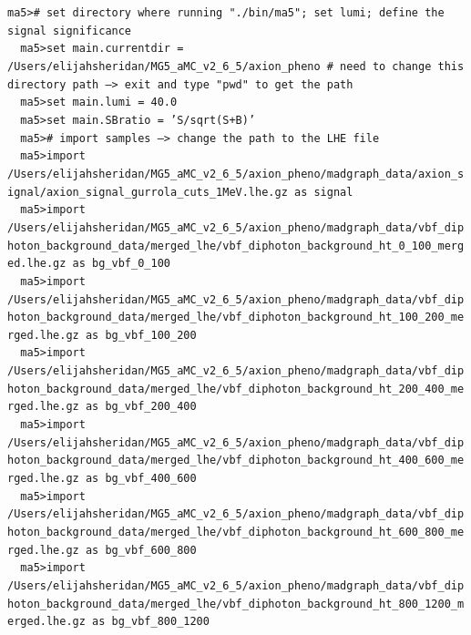 \documentclass[a4paper, 10pt]{article}
\begin{document}
\texttt{ma5>\# set directory where running "./\-bin/\-ma5"; set lumi; define the signal significance\\
}
\texttt{ }\texttt{ }\texttt{ma5>set main.currentdir = /\-Users/\-elijahsheridan/\-MG5\_aMC\_v2\_6\_5/\-axion\_pheno \# need to change this directory path --> exit and type "pwd" to get the path\\
}
\texttt{ }\texttt{ }\texttt{ma5>set main.lumi = 40.0\\
}
\texttt{ }\texttt{ }\texttt{ma5>set main.SBratio = 'S/\-sqrt(S+B)'\\
}
\texttt{ }\texttt{ }\texttt{ma5>\# import samples --> change the path to the LHE file\\
}
\texttt{ }\texttt{ }\texttt{ma5>import /\-Users/\-elijahsheridan/\-MG5\_aMC\_v2\_6\_5/\-axion\_pheno/\-madgraph\_data/\-axion\_signal/\-axion\_signal\_gurrola\_cuts\_1MeV.lhe.gz as signal\\
}
\texttt{ }\texttt{ }\texttt{ma5>import /\-Users/\-elijahsheridan/\-MG5\_aMC\_v2\_6\_5/\-axion\_pheno/\-madgraph\_data/\-vbf\_diphoton\_background\_data/\-merged\_lhe/\-vbf\_diphoton\_background\_ht\_0\_100\_merged.lhe.gz as bg\_vbf\_0\_100\\
}
\texttt{ }\texttt{ }\texttt{ma5>import /\-Users/\-elijahsheridan/\-MG5\_aMC\_v2\_6\_5/\-axion\_pheno/\-madgraph\_data/\-vbf\_diphoton\_background\_data/\-merged\_lhe/\-vbf\_diphoton\_background\_ht\_100\_200\_merged.lhe.gz as bg\_vbf\_100\_200\\
}
\texttt{ }\texttt{ }\texttt{ma5>import /\-Users/\-elijahsheridan/\-MG5\_aMC\_v2\_6\_5/\-axion\_pheno/\-madgraph\_data/\-vbf\_diphoton\_background\_data/\-merged\_lhe/\-vbf\_diphoton\_background\_ht\_200\_400\_merged.lhe.gz as bg\_vbf\_200\_400\\
}
\texttt{ }\texttt{ }\texttt{ma5>import /\-Users/\-elijahsheridan/\-MG5\_aMC\_v2\_6\_5/\-axion\_pheno/\-madgraph\_data/\-vbf\_diphoton\_background\_data/\-merged\_lhe/\-vbf\_diphoton\_background\_ht\_400\_600\_merged.lhe.gz as bg\_vbf\_400\_600\\
}
\texttt{ }\texttt{ }\texttt{ma5>import /\-Users/\-elijahsheridan/\-MG5\_aMC\_v2\_6\_5/\-axion\_pheno/\-madgraph\_data/\-vbf\_diphoton\_background\_data/\-merged\_lhe/\-vbf\_diphoton\_background\_ht\_600\_800\_merged.lhe.gz as bg\_vbf\_600\_800\\
}
\texttt{ }\texttt{ }\texttt{ma5>import /\-Users/\-elijahsheridan/\-MG5\_aMC\_v2\_6\_5/\-axion\_pheno/\-madgraph\_data/\-vbf\_diphoton\_background\_data/\-merged\_lhe/\-vbf\_diphoton\_background\_ht\_800\_1200\_merged.lhe.gz as bg\_vbf\_800\_1200\\
}
\end{document}

